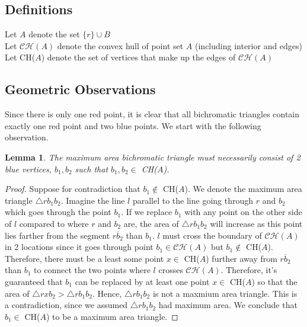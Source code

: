 \documentclass{article}
\newtheorem{lemma}[theorem] {Lemma}
\newcommand{\CH}{\mathcal{C}\mathcal{H}}
\begin{document}
  \subsection*{Definitions}
  Let $A$ denote the set $\{r\} \cup B$ \\
  Let $\CH(A)$ denote the convex hull of point set $A$ (including interior and edges) \\
  Let CH($A$) denote the set of vertices that make up the edges of $\CH(A)$

  \subsection*{Geometric Observations}
  Since there is only one red point, it is clear that all bichromatic triangles contain exactly one red point and two blue points.
  We start with the following observation. \\

  \begin{lemma}
  The maximum area bichromatic triangle must necessarily consist of 2 blue vertices, $b_1, b_2$ such that $b_1, b_2 \in$ CH($A$).
  \end{lemma}

  \begin{proof}
      Suppose for contradiction that $b_1 \notin$ CH($A$). We denote the maximum area triangle $\triangle rb_1b_2$.
      Imagine the line $l$ parallel to the line going through $r$ and $b_{2}$ which goes through the point $b_{1}$.
      If we replace $b_{1}$ with any point on the other side of $l$ compared to where $r$ and $b_{2}$ are, the area of $\triangle rb_1b_2$ will increase as this point lies farther from the segment $\overline{rb_2}$ than $b_1$.
      $l$ must cross the boundary of $\CH(A)$ in 2 locations since it goes through point $b_1 \in \CH(A)$ but $b_1 \notin$ CH($A$).
      Therefore, there must be a least some point $x \in$ CH($A$) further away from $\overline{rb_2}$ than $b_1$ to connect the two points where $l$ crosses $\CH(A)$.
      Therefore, it's guaranteed that $b_{1}$ can be replaced by at least one point $x \in$ CH($A$) so that the area of $\triangle rxb_2 > \triangle rb_1b_2$.
      Hence, $\triangle rb_{1}b_{2}$ is not a maxmium area triangle. This is a contradiction, since we assumed $\triangle rb_1b_2$ had maximum area.
      We conclude that $b_1 \in$ CH($A$) to be a maximum area triangle. 
  \end{proof}
\end{document}

